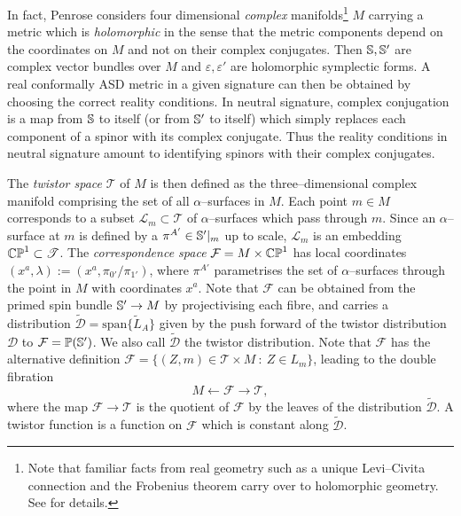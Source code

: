 In fact, Penrose considers four dimensional \textit{complex} manifolds\footnote{Note that familiar facts from real geometry such as a unique Levi--Civita connection and the Frobenius theorem carry over to holomorphic geometry. See \cite{LeBrun83} for details.} $M$ carrying a metric which is \textit{holomorphic} in the sense that the metric components depend on the coordinates on $M$ and not on their complex conjugates. Then $\mathbb{S},\mathbb{S}'$ are complex vector bundles over $M$ and $\varepsilon,\varepsilon'$ are holomorphic symplectic forms. A real conformally ASD metric in a given signature can then be obtained by choosing the correct reality conditions. In neutral signature, complex conjugation is a map from $\mathbb{S}$ to itself (or from $\mathbb{S}'$ to itself) which simply replaces each component of a spinor with its complex conjugate. Thus the reality conditions in neutral signature amount to identifying spinors with their complex conjugates.

The \textit{twistor space} $\mathscr{T}$ of $M$ is then defined as the three--dimensional complex manifold comprising the set of all $\alpha$--surfaces in $M$. Each point $m\in M$ corresponds to a subset $\mathscr{L}_m\subset\mathscr{T}$ of $\alpha$--surfaces which pass through $m$. Since an $\alpha$--surface at $m$ is defined by a $\pi^{A'}\in\mathbb{S}'|_m$ up to scale, $\mathscr{L}_m$ is an embedding $\mathbb{CP}^1\subset\mathscr{T}$. The \textit{correspondence space} $\mathcal{F}=M\times\mathbb{CP}^1$ has local coordinates $(x^a,\lambda):=(x^a,\pi_{0'}/\pi_{1'})$, where $\pi^{A'}$ parametrises the set of $\alpha$--surfaces through the point in $M$ with coordinates $x^a$. Note that $\mathcal{F}$ can be obtained from the primed spin bundle $\mathbb{S}'\rightarrow M$ by projectivising each fibre, and carries a distribution $\tilde{\mathcal{D}}=\mathrm{span}\{\tilde{L}_A\}$ given by the push forward of the twistor distribution $\mathcal{D}$ to $\mathcal{F}=\mathbb{P}(\mathbb{S}')$. We also call $\tilde{\mathcal{D}}$ the twistor distribution. Note that $\mathcal{F}$ has the alternative definition $\mathcal{F}=\{(Z,m)\in \mathscr{T}\times M \ :\  Z\in L_m\}$, leading to the double fibration
\[
M\leftarrow\mathcal{F}\rightarrow\mathscr{T},
\]
where the map $\mathcal{F}\rightarrow\mathscr{T}$ is the quotient of $\mathcal{F}$ by the leaves of the distribution $\tilde{\mathcal{D}}$. A twistor function is a function on $\mathcal{F}$ which is constant along $\tilde{\mathcal{D}}$. %

